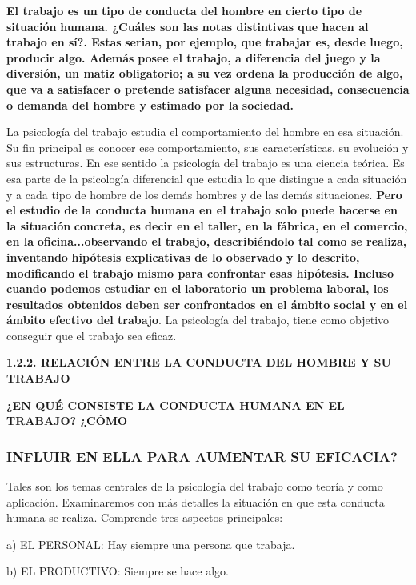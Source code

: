 \textbf{El trabajo es un tipo de conducta del hombre en cierto tipo de situación} \textbf{humana. ¿Cuáles son las notas distintivas que hacen al trabajo en sí?. Estas} \textbf{serian, por ejemplo, que trabajar es, desde luego, producir algo. Además} \textbf{posee el trabajo, a diferencia del juego y la diversión, un matiz obligatorio; a} \textbf{su vez ordena la producción de algo, que va a satisfacer o pretende satisfacer} \textbf{alguna necesidad, consecuencia o demanda del hombre y estimado por la} \textbf{sociedad.}

La psicología del trabajo estudia el comportamiento del hombre en esa situación. Su fin principal es conocer ese comportamiento, sus características, su evolución y sus estructuras. En ese sentido la psicología del trabajo es una ciencia teórica. Es esa parte de la psicología diferencial que estudia lo que distingue a cada situación y a cada tipo de hombre de los demás hombres y de las demás situaciones. \textbf{Pero el} \textbf{estudio de la conducta humana en el trabajo solo puede hacerse en la situación} \textbf{concreta, es decir en el taller, en la fábrica, en el comercio, en la} \textbf{oficina...observando el trabajo, describiéndolo tal como se realiza, inventando} \textbf{hipótesis explicativas de lo observado y lo descrito, modificando el trabajo} \textbf{mismo para confrontar esas hipótesis. Incluso cuando podemos estudiar en el} \textbf{laboratorio un problema laboral, los resultados obtenidos deben ser} \textbf{confrontados en el ámbito social y en el ámbito efectivo del trabajo}. La psicología del trabajo, tiene como objetivo conseguir que el trabajo sea eficaz.



\textbf{1.2.2. RELACIÓN ENTRE LA CONDUCTA DEL HOMBRE Y SU TRABAJO}

\textbf{¿EN QUÉ CONSISTE LA CONDUCTA HUMANA EN EL TRABAJO? ¿CÓMO}

\subsubsection*{INFLUIR EN ELLA PARA AUMENTAR SU EFICACIA?}
Tales son los temas centrales de la psicología del trabajo como teoría y como aplicación. Examinaremos con más detalles la situación en que esta conducta humana se realiza. Comprende tres aspectos principales:

a) EL PERSONAL: Hay siempre una persona que trabaja.

b) EL PRODUCTIVO: Siempre se hace algo.

